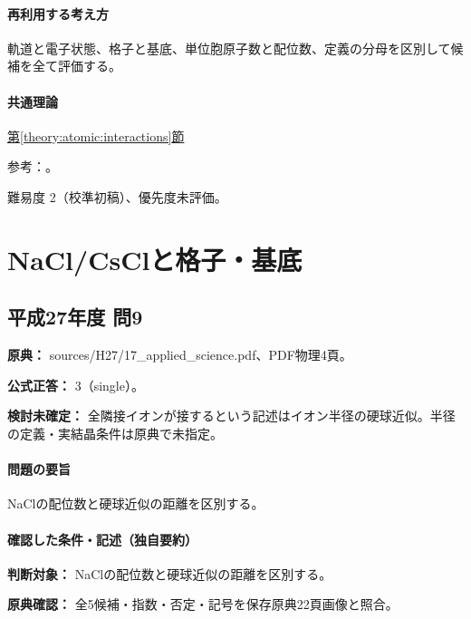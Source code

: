 \paragraph{再利用する考え方} 軌道と電子状態、格子と基底、単位胞原子数と配位数、定義の分母を区別して候補を全て評価する。

\paragraph{共通理論} \hyperref[theory:atomic:interactions]{第\ref*{theory:atomic:interactions}節}

\par 参考：\cite{atomic_lj,atomic_nonbond}。

\par 難易度 2（校準初稿）、優先度未評価。

\section{NaCl/CsClと格子・基底}

\subsection{平成27年度 問9}
\label{q:h27-reg-applied-09}

\noindent\textbf{原典：} sources/H27/17\_applied\_science.pdf、PDF物理4頁。

\textbf{公式正答：} 3（single）。

\par\textbf{検討未確定：} 全隣接イオンが接するという記述はイオン半径の硬球近似。半径の定義・実結晶条件は原典で未指定。

\paragraph{問題の要旨} NaClの配位数と硬球近似の距離を区別する。

\paragraph{確認した条件・記述（独自要約）}\mbox{}\par

\noindent\textbf{判断対象：} NaClの配位数と硬球近似の距離を区別する。\par

\noindent\textbf{原典確認：} 全5候補・指数・否定・記号を保存原典22頁画像と照合。\par

